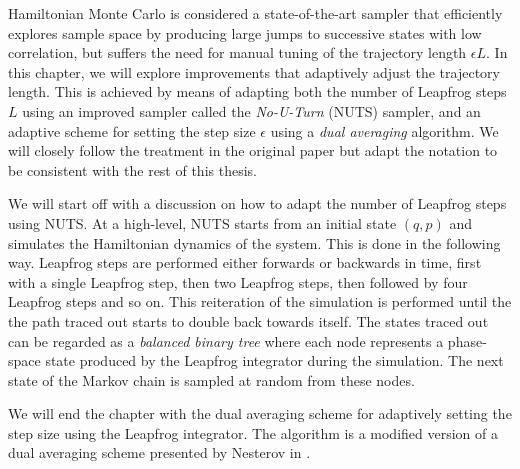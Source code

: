 Hamiltonian Monte Carlo is considered a state-of-the-art sampler that efficiently explores sample space by producing large jumps to successive states with low correlation, 
but suffers the need for manual tuning of the trajectory length $\epsilon L$. 
In this chapter, we will explore improvements that adaptively adjust the trajectory length. This is achieved by means of adapting both the number of Leapfrog steps $L$ using an improved sampler called the \textit{No-U-Turn} (NUTS) sampler, and an adaptive scheme for setting the step size $\epsilon$ using a \textit{dual averaging} algorithm. We will closely follow the treatment in the original paper \cite{nuts} but adapt the notation to be consistent with the rest of this thesis.

We will start off with a discussion on how to adapt the number of Leapfrog steps using NUTS. At a high-level, NUTS starts from an initial state $(q, p)$ and simulates the Hamiltonian dynamics of the system. This is
done in the following way. Leapfrog steps are performed either forwards or backwards in time, first with a single Leapfrog step, then two Leapfrog steps, then followed by four Leapfrog steps and so on. This reiteration of the simulation is performed until the the path traced out starts to double back towards itself. The states traced out can be regarded as a \textit{balanced binary tree} where
each node represents a phase-space state produced by the Leapfrog integrator during the simulation. The next state of the Markov chain is sampled at random from these nodes.  

We will end the chapter with the dual averaging scheme for adaptively setting the step size using the Leapfrog integrator. The algorithm is a modified version of a dual averaging scheme presented by Nesterov in \cite{Nesterov2009}.




